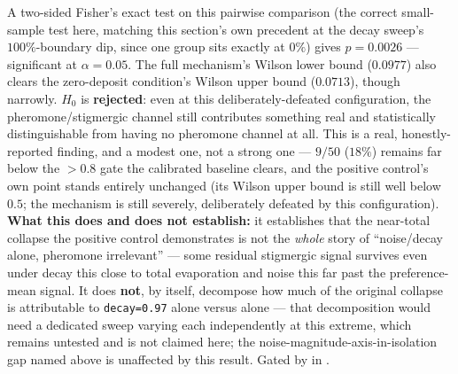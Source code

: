 \documentclass[
  english,
]{article}
\theoremstyle{definition}
\begin{document}
A two-sided Fisher's exact test on this pairwise comparison (the correct
small-sample test here, matching this section's own precedent at the
decay sweep's \(100\%\)-boundary dip, since one group sits exactly at
\(0\%\)) gives \(p = 0.0026\) --- significant at \(\alpha=0.05\). The
full mechanism's Wilson lower bound (\(0.0977\)) also clears the
zero-deposit condition's Wilson upper bound (\(0.0713\)), though
narrowly. \(H_0\) is \textbf{rejected}: even at this
deliberately-defeated configuration, the pheromone/stigmergic channel
still contributes something real and statistically distinguishable from
having no pheromone channel at all. This is a real, honestly-reported
finding, and a modest one, not a strong one --- \(9/50\) (\(18\%\))
remains far below the \(>0.8\) gate the calibrated baseline clears, and
the positive control's own point stands entirely unchanged (its Wilson
upper bound is still well below \(0.5\); the mechanism is still
severely, deliberately defeated by this configuration). \textbf{What
this does and does not establish:} it establishes that the near-total
collapse the positive control demonstrates is not the \emph{whole} story
of ``noise/decay alone, pheromone irrelevant'' --- some residual
stigmergic signal survives even under decay this close to total
evaporation and noise this far past the preference-mean signal. It does
\textbf{not}, by itself, decompose how much of the original collapse is
attributable to \texttt{decay=0.97} alone versus
 alone --- that decomposition would need
a dedicated sweep varying each independently at this extreme, which
remains untested and is not claimed here; the
noise-magnitude-axis-in-isolation gap named above is unaffected by this
result. Gated by
in .
\end{document}
